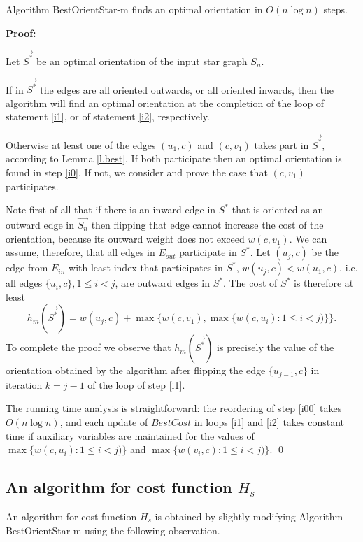 \begin{theorem}\label{t.star}
Algorithm BestOrientStar-m finds an optimal orientation in  $O(n \log n)$ steps.
\end{theorem}  

\noindent \textbf{Proof:}

 Let $\vec{S^*}$ be an optimal orientation of the input star graph $S_n$.
 
 If in $\vec{S^*}$ the edges are all oriented outwards, or all oriented 
 inwards, then the algorithm will find an optimal orientation
 at the completion of the loop of statement \ref{i1}, or
of statement \ref{i2}, respectively.
 
 Otherwise at least one of the edges $(u_1,c)$ and $(c,v_1)$ takes part 
 in $\vec{S^*}$, according to Lemma \ref{l.best}. If both participate then an optimal orientation is found in step \ref{i0}.
 If not, we consider and prove the case that $(c,v_1)$ participates. 
 
 Note first of all that if there is an inward edge in $S^*$ that is oriented as
 an outward edge in $\vec{S_n}$ then flipping that edge cannot
 increase the cost of the orientation, because its outward weight does not exceed $w(c,v_1)$.
 We can assume, therefore, that all edges in $E_{out}$ participate in $S^*$. 
 Let $(u_j,c)$ be the 
 edge from $E_{in}$ with least index that participates in $S^*$, 
  $w(u_j,c)<w(u_1,c)$, i.e. all edges $\{u_i,c\}, 1\leq i<j$, are outward edges in $S^*$. 
 The cost of $S^*$ is therefore at least
 $$h_m(\vec{S^*})=w(u_j,c)+\max \{w(c,v_1),\max \{w(c,u_i):1\leq i<j)\}\}.$$
To complete the proof we observe that $h_m(\vec{S^*})$ is precisely the value of the orientation
obtained by the algorithm after flipping the edge  $\{u_{j-1},c\}$
 in iteration $k=j-1$ of the loop of step \ref{i1}.

The running time  analysis is straightforward: the reordering of step \ref{i00} takes
$O(n \log n)$, and each update of $BestCost$ in loops \ref{i1} and \ref{i2} takes 
constant time if  auxiliary variables are maintained for the values of 
$\max \{w(c,u_i):1\leq i<j)\}$ and $\max \{w(v_i,c):1\leq i<j)\}$.
 \qed
 
  \subsection{An algorithm for cost function $H_s$}
  An algorithm for cost function $H_s$ is obtained by slightly modifying Algorithm BestOrientStar-m using the following observation.
  
